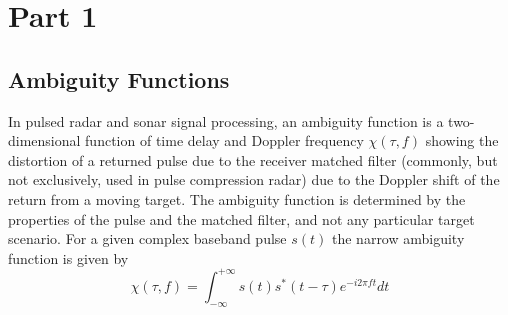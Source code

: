 \documentclass{article}
\begin{document}

\section{Part 1}
\label{sec:part1}
\subsection{Ambiguity Functions}

In pulsed radar and sonar signal processing, an ambiguity function is a two-dimensional function of time delay and Doppler frequency $\chi(\tau,f)$ showing the distortion of a returned pulse due to the receiver matched filter (commonly, but not exclusively, used in pulse compression radar) due to the Doppler shift of the return from a moving target. The ambiguity function is determined by the properties of the pulse and the matched filter, and not any particular target scenario. For a given complex baseband pulse $s(t)$ the narrow ambiguity function is given by \cite{Wiki:2012ambi} $$\chi(\tau,f)= \int_{-\infty}^{+\infty} s(t) s^{*}(t-\tau) e^{-i2 \pi ft} dt$$
\end{document}
